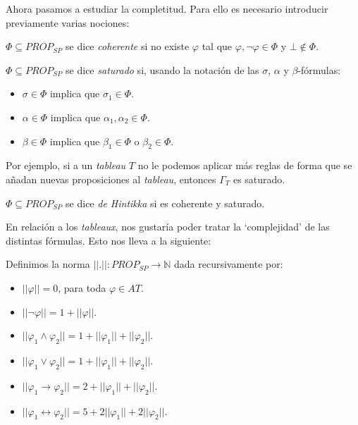 Ahora pasamos a estudiar la completitud. Para ello es necesario introducir previamente varias nociones:

\begin{definition}
$\Phi \subseteq PROP_{SP}$ se dice \textit{coherente} si no existe $\varphi$ tal que $\varphi, \neg \varphi \in \Phi$ y $\bot \notin \Phi$.
\end{definition}

\begin{definition}
$\Phi \subseteq PROP_{SP}$ se dice \textit{saturado} si, usando la notación de las $\sigma$, $\alpha$ y $\beta$-fórmulas:
\begin{itemize}
    \item $\sigma \in \Phi$ implica que $\sigma_1 \in \Phi$.
    \item $\alpha \in \Phi$ implica que $\alpha_1, \alpha_2 \in \Phi$.
    \item $\beta \in \Phi$ implica que $\beta_1 \in \Phi$ o $\beta_2 \in \Phi$.
\end{itemize}
Por ejemplo, si a un \textit{tableau} $T$ no le podemos aplicar más reglas de forma que se añadan nuevas proposiciones al \textit{tableau}, entonces $\Gamma_T$ es saturado.
\end{definition}

\begin{definition}
$\Phi \subseteq PROP_{SP}$ se dice \textit{de Hintikka} si es coherente y saturado.
\end{definition}

En relación a los \textit{tableaux}, nos gustaría poder tratar la `complejidad' de las distintas fórmulas. Esto nos lleva a la siguiente:

\begin{definition}
Definimos la norma $||.||: PROP_{SP} \rightarrow \mathbb{N}$ dada recursivamente por:
\begin{itemize}
    \item $||\varphi|| = 0$, para toda $\varphi \in AT$.
    \item $||\neg \varphi|| = 1 + ||\varphi||$.
    \item $||\varphi_1 \land \varphi_2|| = 1 + ||\varphi_1|| + ||\varphi_2||$.
    \item $||\varphi_1 \lor \varphi_2|| = 1 + ||\varphi_1|| + ||\varphi_2||$.
    \item $||\varphi_1 \rightarrow \varphi_2|| = 2 + ||\varphi_1|| + ||\varphi_2||$.
    \item $||\varphi_1 \leftrightarrow \varphi_2|| = 5 + 2||\varphi_1|| + 2||\varphi_2||$.
\end{itemize}
\end{definition}


